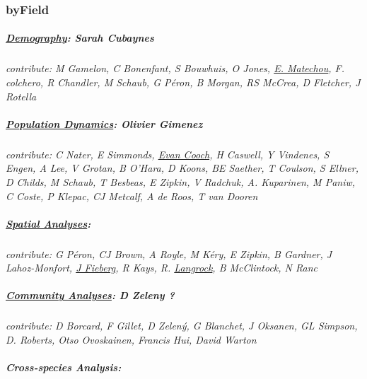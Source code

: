 \documentclass[
]{article}
\begin{document}
\hypertarget{byfield}{%
\subsubsection{byField}\label{byfield}}

\hypertarget{demography-sarah-cubaynes}{%
\subparagraph{\texorpdfstring{\href{byfield_demography.html}{Demography}:
\textbf{Sarah
Cubaynes}}{Demography: Sarah Cubaynes}}\label{demography-sarah-cubaynes}}

\emph{contribute: M Gamelon, C Bonenfant, S Bouwhuis, O Jones,
\href{https://www.kent.ac.uk/mathematics-statistics-actuarial-science/people/1039/matechou-eleni}{E.
Matechou}, F. colchero, R Chandler, M Schaub, G Péron, B Morgan, RS
McCrea, D Fletcher, J Rotella}

\hypertarget{population-dynamics-olivier-gimenez}{%
\subparagraph{\texorpdfstring{\href{byfield_population.html}{Population
Dynamics}: \textbf{Olivier
Gimenez}}{Population Dynamics: Olivier Gimenez}}\label{population-dynamics-olivier-gimenez}}

\emph{contribute: C Nater, E Simmonds,
\href{http://canuck.dnr.cornell.edu/teaching/}{Evan Cooch}, H Caswell, Y
Vindenes, S Engen, A Lee, V Grotan, B O'Hara, D Koons, BE Saether, T
Coulson, S Ellner, D Childs, M Schaub, T Besbeas, E Zipkin, V Radchuk,
A. Kuparinen, M Paniw, C Coste, P Klepac, CJ Metcalf, A de Roos, T van
Dooren}

\hypertarget{spatial-analyses}{%
\subparagraph{\texorpdfstring{\href{byfield_spatial.html}{Spatial
Analyses}:}{Spatial Analyses:}}\label{spatial-analyses}}

\emph{contribute: G Péron, CJ Brown, A Royle, M Kéry, E Zipkin, B
Gardner, J Lahoz-Monfort,
\href{https://fieberg-lab.cfans.umn.edu/people/john-fieberg}{J Fieberg},
R Kays, R.
\href{https://www.uni-bielefeld.de/fakultaeten/wirtschaftswissenschaften/lehrbereiche/stats/team/prof.-dr.-roland-langrock/}{Langrock},
B McClintock, N Ranc}

\hypertarget{community-analyses-d-zeleny}{%
\subparagraph{\texorpdfstring{\href{byfield_community.html}{Community
Analyses}: D Zeleny
?}{Community Analyses: D Zeleny ?}}\label{community-analyses-d-zeleny}}

\emph{contribute: D Borcard, F Gillet, D Zelený, G Blanchet, J Oksanen,
GL Simpson, D. Roberts, Otso Ovoskainen, Francis Hui, David Warton}

\hypertarget{cross-species-analysis}{%
\subparagraph{Cross-species Analysis:}\label{cross-species-analysis}}
\end{document}

